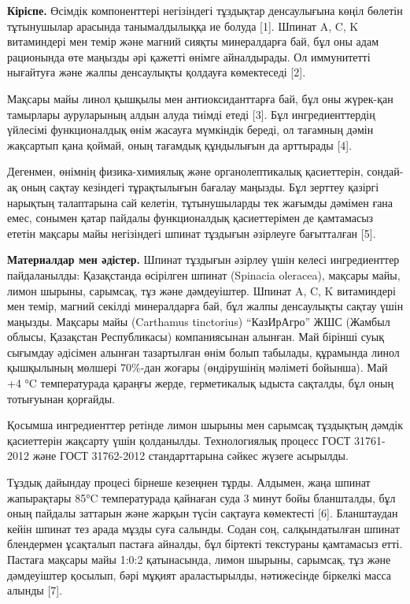 \begin{multicols}{2}
{\bfseries Кіріспе.} Өсімдік компоненттері негізіндегі тұздықтар
денсаулығына көңіл бөлетін тұтынушылар арасында танымалдылыққа ие болуда
{[}1{]}. Шпинат A, C, K витаминдері мен темір және магний сияқты
минералдарға бай, бұл оны адам рационында өте маңызды әрі қажетті өнімге
айналдырады. Ол иммунитетті нығайтуға және жалпы денсаулықты қолдауға
көмектеседі {[}2{]}.

Мақсары майы линол қышқылы мен антиоксиданттарға бай, бұл оны жүрек-қан
тамырлары ауруларының алдын алуда тиімді етеді {[}3{]}. Бұл
ингредиенттердің үйлесімі функционалдық өнім жасауға мүмкіндік береді,
ол тағамның дәмін жақсартып қана қоймай, оның тағамдық құндылығын да
арттырады {[}4{]}.

Дегенмен, өнімнің физика-химиялық және органолептикалық қасиеттерін,
сондай-ақ оның сақтау кезіндегі тұрақтылығын бағалау маңызды. Бұл
зерттеу қазіргі нарықтың талаптарына сай келетін, тұтынушыларды тек
жағымды дәмімен ғана емес, сонымен қатар пайдалы функционалдық
қасиеттерімен де қамтамасыз ететін мақсары майы негізіндегі шпинат
тұздығын әзірлеуге бағытталған {[}5{]}.

{\bfseries Материалдар мен әдістер.} Шпинат тұздығын әзірлеу үшін келесі
ингредиенттер пайдаланылды: Қазақстанда өсірілген шпинат (Spinacia
oleracea), мақсары майы, лимон шырыны, сарымсақ, тұз және дәмдеуіштер.
Шпинат A, C, K витаминдері мен темір, магний секілді минералдарға бай,
бұл жалпы денсаулықты сақтау үшін маңызды. Мақсары майы (Carthamus
tinctorius) ``КазИрАгро'' ЖШС (Жамбыл облысы, Қазақстан Республикасы)
компаниясынан алынған. Май бірінші суық сығымдау әдісімен алынған
тазартылған өнім болып табылады, құрамында линол қышқылының мөлшері
70\%-дан жоғары (өндірушінің мәліметі бойынша). Май +4 °C температурада
қараңғы жерде, герметикалық ыдыста сақталды, бұл оның тотығуынан
қорғайды.

Қосымша ингредиенттер ретінде лимон шырыны мен сарымсақ тұздықтың дәмдік
қасиеттерін жақсарту үшін қолданылды. Технологиялық процесс ГОСТ
31761-2012 және ГОСТ 31762-2012 стандарттарына сәйкес жүзеге асырылды.

Тұздық дайындау процесі бірнеше кезеңнен тұрды. Алдымен, жаңа шпинат
жапырақтары 85°C температурада қайнаған суда 3 минут бойы бланшталды,
бұл оның пайдалы заттарын және жарқын түсін сақтауға көмектесті {[}6{]}.
Бланштаудан кейін шпинат тез арада мұзды суға салынды. Содан соң,
салқындатылған шпинат блендермен ұсақталып пастаға айналды, бұл біртекті
текстураны қамтамасыз етті. Пастаға мақсары майы 1:0:2 қатынасында,
лимон шырыны, сарымсақ, тұз және дәмдеуіштер қосылып, бәрі мұқият
араластырылды, нәтижесінде біркелкі масса алынды {[}7{]}.


\end{multicols}
